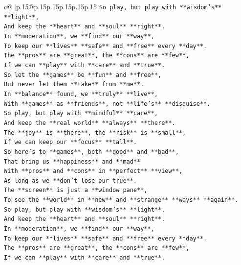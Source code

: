 \documentclass{article}
\begin{document}
{\begin{supertabular}{c@{$\;$}|p{.15\linewidth}@{}p{.15\linewidth}p{.15\linewidth}p{.15\linewidth}p{.15\linewidth}p{.15\linewidth}}
{{{\texttt{So play, but play with **wisdom's** **light**,} \\
\texttt{And keep the **heart** and **soul** **right**.} \\
\texttt{In **moderation**, we **find** our **way**,} \\
\texttt{To keep our **lives** **safe** and **free** every **day**.} \\
\texttt{The **pros** are **great**, the **cons** are **few**,} \\
\texttt{If we can **play** with **care** and **true**.} \\
\texttt{So let the **games** be **fun** and **free**,} \\
\texttt{But never let them **take** from **me**.} \\
\texttt{In **balance** found, we **truly** **live**,} \\
\texttt{With **games** as **friends**, not **life's** **disguise**.} \\
\texttt{So play, but play with **mindful** **care**,} \\
\texttt{And keep the **real world** **always** **there**.} \\
\texttt{The **joy** is **there**, the **risk** is **small**,} \\
\texttt{If we can keep our **focus** **tall**.} \\
\texttt{So here's to **games**, both **good** and **bad**,} \\
\texttt{That bring us **happiness** and **mad**} \\
\texttt{With **pros** and **cons** in **perfect** **view**,} \\
\texttt{As long as we **don't lose our true**.} \\
\texttt{The **screen** is just a **window pane**,} \\
\texttt{To see the **world** in **new** and **strange** **ways** **again**.} \\
\texttt{So play, but play with **wisdom's** **light**,} \\
\texttt{And keep the **heart** and **soul** **right**.} \\
\texttt{In **moderation**, we **find** our **way**,} \\
\texttt{To keep our **lives** **safe** and **free** every **day**.} \\
\texttt{The **pros** are **great**, the **cons** are **few**,} \\
\texttt{If we can **play** with **care** and **true**.} \\
}}}
\end{supertabular}}
\end{document}
